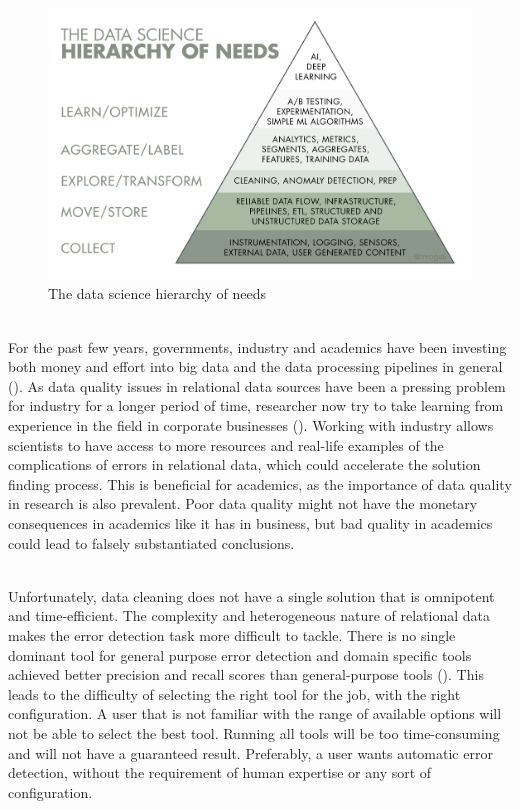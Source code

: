 \begin{figure}
    \centering
    \includegraphics[width=\linewidth]{thesis/Figures/PyramidData.png}
    \caption[The data science hierarchy of needs]{The data science hierarchy of needs\footnotemark}
    \label{fig:pyramid_data}
\end{figure}

~\\For the past few years, governments, industry and academics have been investing both money and effort into big data and the data processing pipelines in general (\cite{Cai2015-hr}). As data quality issues in relational data sources have been a pressing problem for industry for a longer period of time, researcher now try to take learning from experience in the field in corporate businesses (\cite{Stonebraker2018-ag}). Working with industry allows scientists to have access to more resources and real-life examples of the complications of errors in relational data, which could accelerate the solution finding process. This is beneficial for academics, as the importance of data quality in research is also prevalent. Poor data quality might not have the monetary consequences in academics like it has in business, but bad quality in academics could lead to falsely substantiated conclusions. 

~\\Unfortunately, data cleaning does not have a single solution that is omnipotent and time-efficient. The complexity and heterogeneous nature of relational data makes the error detection task more difficult to tackle. There is no single dominant tool for general purpose error detection and domain specific tools achieved better precision and recall scores than general-purpose tools (\cite{Abedjan2016-jc}). 
This leads to the difficulty of selecting the right tool for the job, with the right configuration. A user that is not familiar with the range of available options will not be able to select the best tool. Running all tools will be too time-consuming and will not have a guaranteed result. Preferably, a user wants automatic error detection, without the requirement of human expertise or any sort of configuration.

